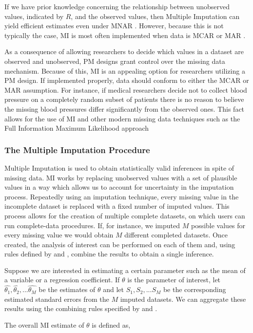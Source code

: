 \documentclass{svjour3}\usepackage[]{graphicx}\usepackage[]{color}
\begin{document}
If we have prior knowledge concerning the relationship between unobserved values, indicated by $R$, and the observed values, then Multiple Imputation can yield efficient estimates even under MNAR \citep{harel2007multiple}. However, because this is not typically the case, MI is most often implemented when data is MCAR or MAR \citep{little2014statistical}. \par

As a consequence of allowing researchers to decide which values in a dataset are observed and unobserved, PM designs grant control over the missing data mechanism. Because of this, MI is an appealing option for researchers utilizing a PM design. If implemented properly, data should conform to either the MCAR or MAR assumption. For instance, if medical researchers decide not to collect blood pressure on a completely random subset of patients there is no reason to believe the missing blood pressures differ significantly from the observed ones. This fact allows for the use of MI and other modern missing data techniques such as the Full Information Maximum Likelihood approach \citep{dempster1977maximum} \par

\subsubsection{The Multiple Imputation Procedure}
\label{sec:1.3.2}
Multiple Imputation is used to obtain statistically valid inferences in spite of missing data. MI works by replacing unobserved values with a set of plausible values in a way which allows us to account for uncertainty in the imputation process. Repeatedly using an imputation technique, every missing value in the incomplete dataset is replaced with a fixed number of imputed values. This process allows for the creation of multiple complete datasets, on which users can run complete-data procedures. If, for instance, we imputed $M$ possible values for every missing value we would obtain $M$ different completed datasets. Once created, the analysis of interest can be performed on each of them and, using rules defined by \citet{little2014statistical} and \citet{rubin2004multiple}, combine the results to obtain a single inference. \par

Suppose we are interested in estimating a certain parameter such as the mean of a variable or a regression coefficient. If $\theta$ is the parameter of interest, let $\widehat{\theta_1}, \widehat{\theta_2}, ... \widehat{\theta_M}$ be the estimates of $\theta$ and let $S_1, S_2, ... S_M$ be the corresponding estimated standard errors from the $M$ imputed datasets. We can aggregate these results using the combining rules specified by \citet{little2014statistical} and \citet{rubin2004multiple}. \par
The overall MI estimate of $\theta$ is defined as,
\end{document}
